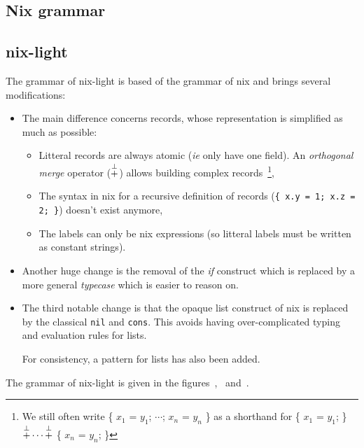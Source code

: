 \subsection{Nix grammar}
\label{sec:nix-grammar}


\subsection{nix-light}
\label{sec:nix-light-grammar}

The grammar of nix-light is based of the grammar of nix and brings several
modifications:
\begin{itemize}
  \item The main difference concerns records, whose representation is simplified as
    much as possible:

    \begin{itemize}
      \item Litteral records are always atomic (\emph{ie} only have one field). An
        \emph{orthogonal merge} operator ($\overset{\bot}{+}$) allows building complex
        records~\footnote{We still often write \{ $x_1$ = $y_1$; $\cdots{}$;
        $x_n$ = $y_n$ \} as a shorthand for \{ $x_1$ = $y_1$; \} $\overset{\bot}{+}
        \cdots{} \overset{\bot}{+}$ \{ $x_n$ = $y_n$; \}},

      \item The syntax in nix for a recursive definition of records (\texttt{\{ x.y
        = 1; x.z = 2; \}}) doesn't exist anymore,

      \item The labels can only be nix expressions (so litteral labels must be
        written as constant strings).
    \end{itemize}

  \item Another huge change is the removal of the \emph{if} construct which is
    replaced by a more general \emph{typecase} which is easier to reason on.

  \item The third notable change is that the opaque list construct of nix is
    replaced by the classical \texttt{nil} and \texttt{cons}.
    This avoids having over-complicated typing and evaluation rules for lists.

    For consistency, a pattern for lists has also been added.
\end{itemize}

The grammar of nix-light is given in the
figures~,~
and~.

